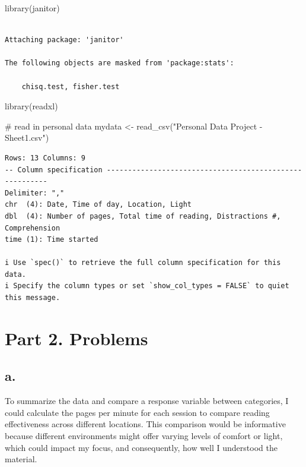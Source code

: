 \documentclass[
  letterpaper,
  DIV=11,
  numbers=noendperiod]{scrartcl}
\newenvironment{Shaded}{\begin{snugshade}}{\end{snugshade}}
\newcommand{\CommentTok}[1]{\textcolor[rgb]{0.37,0.37,0.37}{#1}}
\newcommand{\FunctionTok}[1]{\textcolor[rgb]{0.28,0.35,0.67}{#1}}
\newcommand{\NormalTok}[1]{\textcolor[rgb]{0.00,0.23,0.31}{#1}}
\newcommand{\OtherTok}[1]{\textcolor[rgb]{0.00,0.23,0.31}{#1}}
\newcommand{\StringTok}[1]{\textcolor[rgb]{0.13,0.47,0.30}{#1}}
\begin{document}
\begin{Shaded}
\begin{Highlighting}[]
\FunctionTok{library}\NormalTok{(janitor)}
\end{Highlighting}
\end{Shaded}

\begin{verbatim}

Attaching package: 'janitor'

The following objects are masked from 'package:stats':

    chisq.test, fisher.test
\end{verbatim}

\begin{Shaded}
\begin{Highlighting}[]
\FunctionTok{library}\NormalTok{(readxl)}

\CommentTok{\# read in personal data}
\NormalTok{mydata }\OtherTok{\textless{}{-}} \FunctionTok{read\_csv}\NormalTok{(}\StringTok{"Personal Data Project {-} Sheet1.csv"}\NormalTok{)}
\end{Highlighting}
\end{Shaded}

\begin{verbatim}
Rows: 13 Columns: 9
-- Column specification --------------------------------------------------------
Delimiter: ","
chr  (4): Date, Time of day, Location, Light
dbl  (4): Number of pages, Total time of reading, Distractions #, Comprehension
time (1): Time started

i Use `spec()` to retrieve the full column specification for this data.
i Specify the column types or set `show_col_types = FALSE` to quiet this message.
\end{verbatim}

\section{Part 2. Problems}\label{part-2.-problems}

\subsection{a.}\label{a.}

To summarize the data and compare a response variable between
categories, I could calculate the pages per minute for each session to
compare reading effectiveness across different locations. This
comparison would be informative because different environments might
offer varying levels of comfort or light, which could impact my focus,
and consequently, how well I understood the material.
\end{document}
